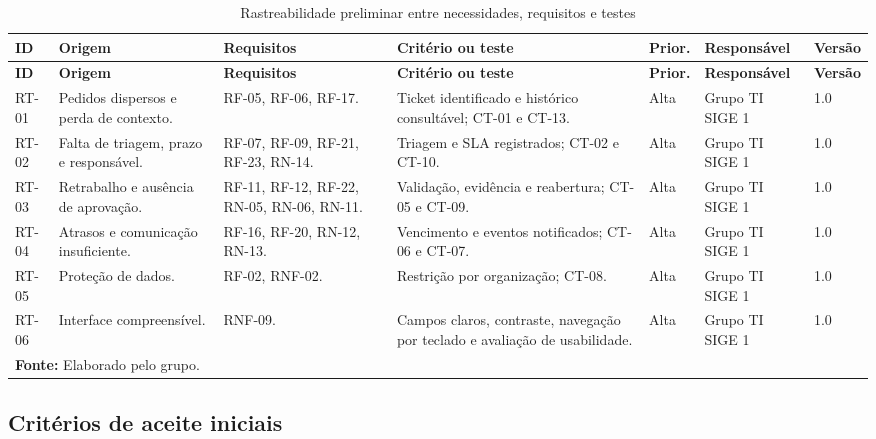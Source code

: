 \scriptsize
\begin{longtable}{p{}p{}p{}p{}p{}p{}p{}}
\caption{Rastreabilidade preliminar entre necessidades, requisitos e testes}\label{tab:rastreabilidade}\\
\hline
\textbf{ID} & \textbf{Origem} & \textbf{Requisitos} & \textbf{Critério ou teste} & \textbf{Prior.} & \textbf{Responsável} & \textbf{Versão} \\
\hline
\endfirsthead
\hline
\textbf{ID} & \textbf{Origem} & \textbf{Requisitos} & \textbf{Critério ou teste} & \textbf{Prior.} & \textbf{Responsável} & \textbf{Versão} \\
\hline
\endhead
RT-01 & Pedidos dispersos e perda de contexto. & RF-05, RF-06, RF-17. & Ticket identificado e histórico consultável; CT-01 e CT-13. & Alta & Grupo TI SIGE 1 & 1.0 \\
RT-02 & Falta de triagem, prazo e responsável. & RF-07, RF-09, RF-21, RF-23, RN-14. & Triagem e SLA registrados; CT-02 e CT-10. & Alta & Grupo TI SIGE 1 & 1.0 \\
RT-03 & Retrabalho e ausência de aprovação. & RF-11, RF-12, RF-22, RN-05, RN-06, RN-11. & Validação, evidência e reabertura; CT-05 e CT-09. & Alta & Grupo TI SIGE 1 & 1.0 \\
RT-04 & Atrasos e comunicação insuficiente. & RF-16, RF-20, RN-12, RN-13. & Vencimento e eventos notificados; CT-06 e CT-07. & Alta & Grupo TI SIGE 1 & 1.0 \\
RT-05 & Proteção de dados. & RF-02, RNF-02. & Restrição por organização; CT-08. & Alta & Grupo TI SIGE 1 & 1.0 \\
RT-06 & Interface compreensível. & RNF-09. & Campos claros, contraste, navegação por teclado e avaliação de usabilidade. & Alta & Grupo TI SIGE 1 & 1.0 \\
\hline
\multicolumn{7}{l}{\footnotesize\textbf{Fonte:} Elaborado pelo grupo.}
\end{longtable}
\normalsize

\subsection{Critérios de aceite iniciais}

